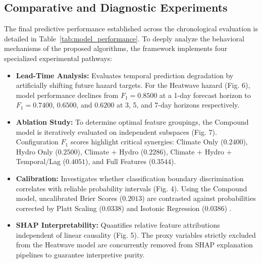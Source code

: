 \subsection{Comparative and Diagnostic Experiments}
The final predictive performance established across the chronological evaluation is detailed in Table~\ref{tab:model_performance}. To deeply analyze the behavioral mechanisms of the proposed algorithms, the framework implements four specialized experimental pathways:
\begin{itemize}
    \item \textbf{Lead-Time Analysis:} Evaluates temporal prediction degradation by artificially shifting future hazard targets. For the Heatwave hazard (Fig. 6), model performance declines from $F_1 = 0.8500$ at a 1-day forecast horizon to $F_1 = 0.7400$, $0.6500$, and $0.6200$ at 3, 5, and 7-day horizons respectively. 
    \item \textbf{Ablation Study:} To determine optimal feature groupings, the Compound model is iteratively evaluated on independent subspaces (Fig. 7). Configuration $F_1$ scores highlight critical synergies: Climate Only ($0.2400$), Hydro Only ($0.2500$), Climate + Hydro ($0.2286$), Climate + Hydro + Temporal/Lag ($0.4051$), and Full Features ($0.3544$).
    \item \textbf{Calibration:} Investigates whether classification boundary discrimination correlates with reliable probability intervals (Fig. 4). Using the Compound model, uncalibrated Brier Scores ($0.2013$) are contrasted against probabilities corrected by Platt Scaling ($0.0338$) \cite{Platt1999} and Isotonic Regression ($0.0386$) \cite{Zadrozny2002}. 
    \item \textbf{SHAP Interpretability:} Quantifies relative feature attributions independent of linear causality (Fig. 5). The proxy variables strictly excluded from the Heatwave model are concurrently removed from SHAP explanation pipelines to guarantee interpretive purity.
\end{itemize}

\begin{table}[htbp]
\caption{Final Offline Test Performance (2016--2018)}
\begin{center}
\label{tab:model_performance}
\end{center}
\end{table}

